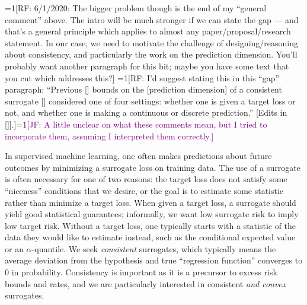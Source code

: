 \documentclass{article}
\newcommand{\Comments}{1}
\newcommand{\mynote}[2]{\ifnum\Comments=1\textcolor{#1}{#2}\fi}
\newcommand{\mytodo}[2]{\ifnum\Comments=1%
	\todo[linecolor=#1!80!black,backgroundcolor=#1,bordercolor=#1!80!black]{#2}\fi}
\newcommand{\raf}[1]{\mynote{green!80!blue}{[RF: #1]}}
\newcommand{\raft}[1]{\mytodo{green!20!white}{RF: #1}}
\newcommand{\jessie}[1]{\mynote{purple}{[JF: #1]}}
\begin{document}
\raf{6/1/2020: The bigger problem though is the end of my ``general comment'' above.  The intro will be much stronger if we can state the gap --- and that's a general principle which applies to almost any paper/proposal/research statement.  In our case, we need to motivate the challenge of designing/reasoning about consistency, and particularly the work on the prediction dimension.  You'll probably want another paragraph for this bit; maybe you have some text that you cut which addresses this?}
\raf{I'd suggest stating this in this ``gap'' paragraph: ``Previous [] bounds on the [prediction dimension] of a consistent surrogate [] considered one of four settings: whether one is given a target loss or not, and whether one is making a continuous or discrete prediction.''  [Edits in []].}\jessie{A little unclear on what these comments mean, but I tried to incorporate them, assuming I interpreted them correctly.}


In supervised machine learning, one often makes predictions about future outcomes by minimizing a surrogate loss on training data.
The use of a surrogate is often necessary for one of two reasons: the target loss does not satisfy some ``niceness'' conditions that we desire, or the goal is to estimate some statistic rather than minimize a target loss.
When given a target loss, a surrogate should yield good statistical guarantees; informally, we want low surrogate risk to imply low target risk.
Without a target loss, one typically starts with a statistic of the data they would like to estimate instead, such as the conditional expected value or an $\alpha$-quantile.
We seek \emph{consistent} surrogates, which typically means the average deviation from the hypothesis and true ``regression function'' converges to 0 in probability.
Consistency is important as it is a precursor to excess risk bounds and rates, and we are particularly interested in consistent \emph{and convex} surrogates.
\end{document}

